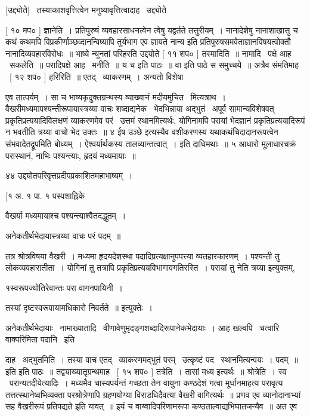 \documentclass[11pt, openany]{book}
\begin{document}
 [उद्द्योते] \textendash\ तस्याकाशवृत्तित्वेन मनुष्यावृत्तित्वादाह \textendash\ उद्द्योते 

 [ १० मप० ] ज्ञानेति~। प्रतिपुरुषं व्यवहारसाधनत्वेन त्वेषु
यद्वर्तते तत्तुरीयम्~। नानादेशेषु नानाशाखासु च कथं कथमपि
विप्रकीर्णाञ्छव्दानन्विष्यापि तुर्यभाग एव ज्ञायते नान्य इति
प्रतिपुरुषसमवेताज्ञानविषयत्वोक्तौ नानादिव्यवहारविरोधः~॥ भाष्ये न्यूनतां
परिहरति उद्दयोते [ ११ शप० ] तस्मादिति~॥ नामादि \textendash\ पक्षे आह \textendash\ सकलेति~॥
परादिपक्षे आह \textendash\ मनीति~॥ {\qt य च} इति पाठः~॥ {\qt वा} इति पाठे स समुच्चये~॥
अत्रैव संमतिमाह \textendash\ [ १२ शप० ] हरिरिति~॥ एतद् \textendash\ व्याकरणम्~। अन्यतो
विशेषा



एव तात्पर्यम्~। सा च भाष्यकृदुक्तग्रन्थस्य व्याख्यानं मदीयमुचित \textendash\ 
मित्यत्राथ~। वैखरीमध्यमापश्यन्तीरूपायास्त्रय्या वाचः शष्दाद्यनेक \textendash\ 
भेदभिन्नाया अद्भुतं \textendash\ अपूर्व सामान्यविशेषवत् प्रकृतिप्रत्ययादिविलक्षणं
व्याकरणमेव परं \textendash\ उत्तमं स्थानमित्यर्थः, योगिनामपि परायां भेदज्ञानं
प्रकृतिप्रत्ययादिरूपं न भवतीति त्रय्या वाचो भेद उक्तः~॥ ४ ईष उञ्छे
इत्यस्यैव वशीकरणस्य यथाकथंचिदादानरूपत्वेन संभवादेतद्रूपमिति बोध्यम्~। 
ऐश्वर्यार्थकस्य तालव्यान्तत्वात्~। इति दाधिमथाः~॥ ५ आधारो मूलाधारचक्रं
परास्थानं, नाभिः पश्यन्त्याः, हृदयं मध्यमायाः~॥ 

४४ उद्द्योतपरिवृत्तप्रदीपप्रकाशितमहाभाष्यम्~। 

 [१ अ. १ पा. १ पस्पशाह्निके 



वैखर्या मध्यमायाश्च पश्यन्त्याश्वैतदद्धुतम्~। 

अनेकतीर्थभेदायास्त्रय्या वाचः परं पदम्~॥ 

 तत्र श्रोत्रविषया वैखरी~। मध्यमा हृदयदेशस्था
पदादिप्रत्यक्षानुपपत्त्या व्यतहारकारणम्~। पश्यन्ती तु
लोकव्यवहारातीता~। योगिनां तु तत्रापि प्रकृतिप्रत्ययविभागावगतिरस्ति~। 
परायां तु नेति त्रय्या इत्युक्तम्, 

१स्वरूपज्योतिरेवान्तः परा वागनपायिनी~। 

तस्यां दृष्टस्वरूपायामधिकारो निवर्तते~॥ इत्युक्तेः~। 

 अनेकतीर्थभेदायाः \textendash\ नामाख्यातादि \textendash\ वीणावेणुमृदङ्गशब्दादिरूपानेकभेदायाः~। आह
खल्वपि \textendash\ चत्वारि वाक्परिमिता पदानि \textendash\ इति 



दाह \textendash\ अद्भुतमिति~। तस्या वाच एतद् \textendash\ व्याकरणमद्भुतं परम् \textendash\ उत्कृष्टं
पद \textendash\ स्थानमित्यन्वयः~। {\qt पदम्~॥ इति} इति पाठः~॥
तद्व्याख्यातृग्रन्थमाह \textendash\ [ १५ शप० ] तत्रेति~। तासां मध्य इत्यर्थः~॥
श्रोत्रेति~। स्व \textendash\ परान्यतदीयेत्यादिः~। मध्यमैव चास्यपर्यन्तं गच्छता तेन
वायुना कण्ठदेशं गत्वा मूर्धानमाहत्य परावृत्य तत्तत्स्थानेष्वभिव्यक्ता
परश्रोत्रेणापि ग्रहणयोग्या विराडधिदैवत्या वैखरी वागित्यर्थः~॥ प्रणव एव
व्यानोदानाभ्यां सह वैखरीरूपं प्रतिपद्यते इति यावत्~॥ इयं च
वाय्वादिपरिणामरूपा कण्ठताल्वाद्यभिघातजन्यैव~॥ अत एव \textendash\ 
\end{document}
